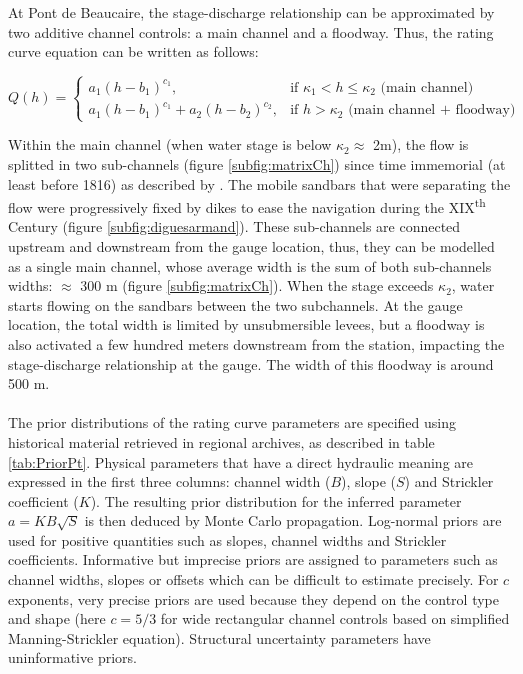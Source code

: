 \documentclass[11pt]{article}
\begin{document}
         At Pont de Beaucaire, the stage-discharge relationship can be approximated by two additive channel controls: a main channel and a floodway. Thus, the rating curve equation can be written as follows: 

        \begin{equation}
        Q(h) =
          \begin{cases}
           a_1(h-b_1)^{c_1}, & \text{if $\kappa_1 < h \leq \kappa_2$ (main channel) }\\
           a_1(h-b_1)^{c_1}+ a_2(h-b_2)^{c_2}, & \text{if $h > \kappa_2$ (main channel + floodway)}
          \end{cases}
          \label{eq:RcPt}
        \end{equation}

    Within the main channel (when water stage is below $\kappa_2 \approx$ 2m), the flow is splitted in two sub-channels (figure \ref{subfig:matrixCh}) since time immemorial (at least before 1816) as described by \citet{armand_ii_1907}. The mobile sandbars that were separating the flow were progressively fixed by dikes to ease the navigation during the XIX\textsuperscript{th} Century (figure \ref{subfig:diguesarmand}). These sub-channels are connected upstream and downstream from the gauge location, thus, they can be modelled as a single main channel, whose average width is the sum of both sub-channels widths: $\approx$ 300 m (figure \ref{subfig:matrixCh}). When the stage exceeds $\kappa_2$, water starts flowing on the sandbars between the two subchannels. At the gauge location, the total width is limited by unsubmersible levees, but a floodway is also activated a few hundred meters downstream from the station, impacting the stage-discharge relationship at the gauge. The width of this floodway is around 500 m.   
    \paragraph{}
    The prior distributions of the rating curve parameters are specified using historical material retrieved in regional archives, as described in table \ref{tab:PriorPt}. Physical parameters that have a direct hydraulic meaning are expressed in the first three columns: channel width ($B$), slope ($S$) and Strickler coefficient ($K$). The resulting prior distribution for the inferred parameter $a=KB\sqrt S$ is then deduced by Monte Carlo propagation. Log-normal priors are used for positive quantities such as slopes, channel widths and Strickler coefficients. Informative but imprecise priors are assigned to parameters such as channel widths, slopes or offsets which can be difficult to estimate precisely. For $c$ exponents, very precise priors are used because they depend on the control type and shape (here $c=5/3$ for wide rectangular channel controls based on simplified Manning-Strickler equation). Structural uncertainty parameters have uninformative priors.
\end{document}
